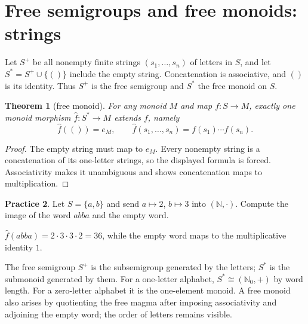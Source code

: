 \documentclass[11pt,openany]{book}
\newcommand{\N}{\mathbb N}\newcommand{\Z}{\mathbb Z}
\newtheorem{theorem}{Theorem}[chapter]
\theoremstyle{definition}
\newtheorem{exercise}[theorem]{Practice}
\begin{document}
\section{Free semigroups and free monoids: strings}
Let $S^+$ be all nonempty finite strings $(s_1,\ldots,s_n)$ of letters in $S$, and let $S^*=S^+\cup\{()\}$ include the empty string. Concatenation is associative, and $()$ is its identity. Thus $S^+$ is the free semigroup and $S^*$ the free monoid on $S$.
\begin{theorem}[free monoid]For any monoid $M$ and map $f:S\to M$, exactly one monoid morphism $\widehat f:S^*\to M$ extends $f$, namely
\[\widehat f(())=e_M,\qquad \widehat f(s_1,\ldots,s_n)=f(s_1)\cdots f(s_n).\]
\end{theorem}
\begin{proof}The empty string must map to $e_M$. Every nonempty string is a concatenation of its one-letter strings, so the displayed formula is forced. Associativity makes it unambiguous and shows concatenation maps to multiplication.\end{proof}
\begin{exercise}Let $S=\{a,b\}$ and send $a\mapsto2$, $b\mapsto3$ into $(\N,\cdot)$. Compute the image of the word $abba$ and the empty word.\end{exercise}
\begin{solution}$\widehat f(abba)=2\cdot3\cdot3\cdot2=36$, while the empty word maps to the multiplicative identity $1$.\end{solution}
The free semigroup $S^+$ is the subsemigroup generated by the letters; $S^*$ is the submonoid generated by them. For a one-letter alphabet, $S^*\cong(\N_0,+)$ by word length. For a zero-letter alphabet it is the one-element monoid. A free monoid also arises by quotienting the free magma after imposing associativity and adjoining the empty word; the order of letters remains visible.
\end{document}

